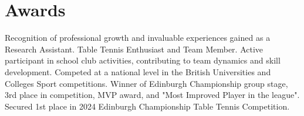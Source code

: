 \section{Awards}
  \resumeSubHeadingListStart
      {Recognition of professional growth and invaluable experiences gained as a Research Assistant.}
      {Table Tennis Enthusiast and Team Member. Active participant in school club activities, contributing to team dynamics and skill development.}
      {Competed at a national level in the British Universities and Colleges Sport competitions.}
      {Winner of Edinburgh Championship group stage, 3rd place in competition, MVP award, and "Most Improved Player in the league".}
      {Secured 1st place in 2024 Edinburgh Championship Table Tennis Competition.}
  \resumeSubHeadingListEnd